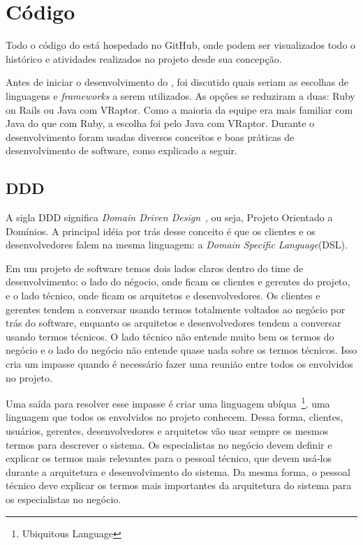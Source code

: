 \section{Código}

Todo o código do \calopsita{} está hospedado no GitHub, onde podem ser visualizados todo o histórico e atividades realizados no projeto desde sua concepção.

Antes de iniciar o desenvolvimento do \calopsita{}, foi discutido quais seriam as escolhas de linguagens e \textit{frameworks} a serem utilizados. As opções se reduziram a duas: Ruby on Rails ou Java com VRaptor. Como a maioria da equipe era mais familiar com Java do que com Ruby, a escolha foi pelo Java com VRaptor. Durante o desenvolvimento foram usadas diversos conceitos e boas práticas de desenvolvimento de software, como explicado a seguir.


\subsection{DDD}

A sigla DDD significa \textit{Domain Driven Design}~\cite{ddd}, ou seja, Projeto Orientado a Domínios. A principal idéia por trás desse conceito é que os clientes e os desenvolvedores falem na mesma linguagem: a \textit{Domain Specific Language}(DSL).

Em um projeto de software temos dois lados claros dentro do time de desenvolvimento: o lado do négocio, onde ficam os clientes e gerentes do projeto, e o lado técnico, onde ficam os arquitetos e desenvolvedores. Os clientes e gerentes tendem a conversar usando termos totalmente voltados ao negócio por trás do software, enquanto os arquitetos e desenvolvedores tendem a conversar usando termos técnicos. O lado técnico não entende muito bem os termos do negócio e o lado do negócio não entende quase nada sobre os termos técnicos. Isso cria um impasse quando é necessário fazer uma reunião entre todos os envolvidos no projeto.

Uma saída para resolver esse impasse é criar uma linguagem ubíqua~\footnote{Ubiquitous Language}, uma linguagem que todos os envolvidos no projeto conhecem. Dessa forma, clientes, usuários, gerentes, desenvolvedores e arquitetos vão usar sempre os mesmos termos para descrever o sistema. Os especialistas no negócio devem definir e explicar os termos mais relevantes para o pessoal técnico, que devem usá-los durante a arquitetura e desenvolvimento do sistema. Da mesma forma, o pessoal técnico deve explicar os termos mais importantes da arquitetura do sistema para os especialistas no negócio.

